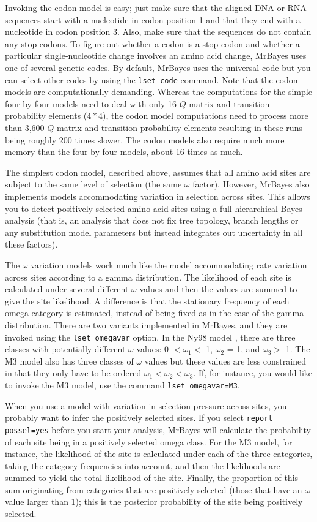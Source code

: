 \documentclass[12pt]{book}
\begin{document}
Invoking the codon model is easy; just make sure that the aligned DNA or RNA sequences start with a
nucleotide in codon position 1 and that they end with a nucleotide in codon position 3. Also, make
sure that the sequences do not contain any stop codons. To figure out whether a codon is a stop
codon and whether a particular single-nucleotide change involves an amino acid change, MrBayes uses
one of several genetic codes. By default, MrBayes uses the universal code but you can select other
codes by using the \texttt{lset code} command. Note that the codon models are computationally
demanding. Whereas the computations for the simple four by four models need to deal with only 16
$Q$-matrix and transition probability elements ($4*4$), the codon model computations need to
process more than 3,600 $Q$-matrix and transition probability elements resulting in these runs
being roughly 200 times slower. The codon models also require much more memory than the four by
four models, about 16 times as much.

The simplest codon model, described above, assumes that all amino acid sites are subject to the
same level of selection (the same $\omega$ factor). However, MrBayes also implements models
accommodating variation in selection across sites. This allows you to detect positively selected
amino-acid sites using a full hierarchical Bayes analysis (that is, an analysis that does not fix
tree topology, branch lengths or any substitution model parameters but instead integrates out
uncertainty in all these factors).

The $\omega$ variation models work much like the model accommodating rate variation across sites
according to a gamma distribution. The likelihood of each site is calculated under several
different $\omega$ values and then the values are summed to give the site likelihood. A difference
is that the stationary frequency of each omega category is estimated, instead of being fixed as in
the case of the gamma distribution. There are two variants implemented in MrBayes, and they are
invoked using the \texttt{lset omegavar} option. In the Ny98 model \citep{nielsen98}, there are
three classes with potentially different $\omega$ values: 0 $< \omega_1 <$ 1, $\omega_2$ = 1, and
$\omega_3 >$ 1. The M3 model also has three classes of $\omega$ values but these values are less
constrained in that they only have to be ordered $\omega_1 < \omega_2 < \omega_3$. If, for
instance, you would like to invoke the M3 model, use the command \texttt{lset omegavar=M3}.

When you use a model with variation in selection pressure across sites, you probably want to infer
the positively selected sites. If you select \texttt{report possel=yes} before you start your
analysis, MrBayes will calculate the probability of each site being in a positively selected omega
class. For the M3 model, for instance, the likelihood of the site is calculated under each of the
three categories, taking the category frequencies into account, and then the likelihoods are summed
to yield the total likelihood of the site. Finally, the proportion of this sum originating from
categories that are positively selected (those that have an $\omega$ value larger than 1); this is
the posterior probability of the site being positively selected.
\end{document}
